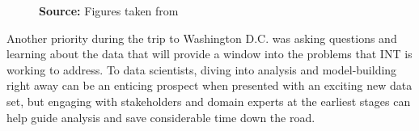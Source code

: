 \begin{figure}[H]
\begin{subfigure}[t]{0.5\textwidth}
\end{subfigure}
\label{fig_bid2}
\footnotesize{\textbf{Source:} Figures taken from \cite{wb_poster}}
\end{figure}



Another priority during the trip to Washington D.C. was asking questions and learning about the data that will provide a window into the problems that INT is working to address. To data scientists, diving into analysis and model-building right away can be an enticing prospect when presented with an exciting new data set, but engaging with stakeholders and domain experts at the earliest stages can help guide analysis and save considerable time down the road.






